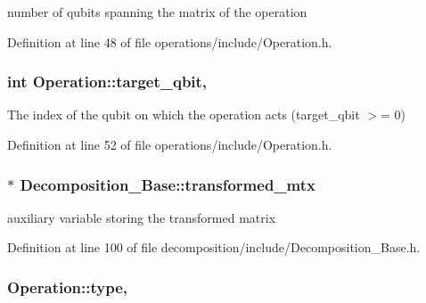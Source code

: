 number of qubits spanning the matrix of the operation 



Definition at line 48 of file operations/include/\+Operation.\+h.

\subsubsection[{\texorpdfstring{target\+\_\+qbit}{target_qbit}}]{\setlength{\rightskip}{0pt plus 5cm}int Operation\+::target\+\_\+qbit\hspace{0.3cm}{\ttfamily [protected]}, {\ttfamily [inherited]}}\hypertarget{class_operation_a3e489b72c124b494777c71b1646bb1e9}{}\label{class_operation_a3e489b72c124b494777c71b1646bb1e9}


The index of the qubit on which the operation acts (target\+\_\+qbit $>$= 0) 



Definition at line 52 of file operations/include/\+Operation.\+h.

\subsubsection[{\texorpdfstring{transformed\+\_\+mtx}{transformed_mtx}}]{ $\ast$ Decomposition\+\_\+\+Base\+::transformed\+\_\+mtx\hspace{0.3cm}{\ttfamily [protected]}}\hypertarget{class_decomposition___base_ae6fa4013266ee6e702b7e645c6bbfed1}{}\label{class_decomposition___base_ae6fa4013266ee6e702b7e645c6bbfed1}


auxiliary variable storing the transformed matrix 



Definition at line 100 of file decomposition/include/\+Decomposition\+\_\+\+Base.\+h.

\subsubsection[{\texorpdfstring{type}{type}}]{ Operation\+::type\hspace{0.3cm}{\ttfamily [protected]}, {\ttfamily [inherited]}}\hypertarget{class_operation_ad47c56c86d62a4c775571e1600416479}{}\label{class_operation_ad47c56c86d62a4c775571e1600416479}


